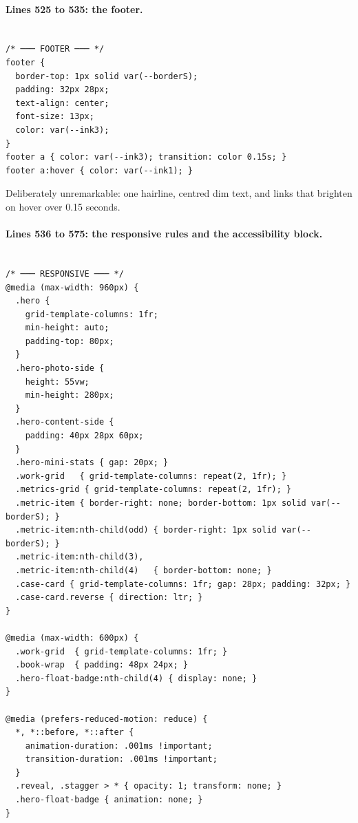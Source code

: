 \paragraph{Lines 525 to 535: the footer.}

\begin{lstlisting}[firstnumber=525,caption={\file{css/site.css}, lines 525--535}]

/* ─── FOOTER ─── */
footer {
  border-top: 1px solid var(--borderS);
  padding: 32px 28px;
  text-align: center;
  font-size: 13px;
  color: var(--ink3);
}
footer a { color: var(--ink3); transition: color 0.15s; }
footer a:hover { color: var(--ink1); }
\end{lstlisting}

Deliberately unremarkable: one hairline, centred dim text, and links that brighten
on hover over 0.15 seconds.

\paragraph{Lines 536 to 575: the responsive rules and the accessibility block.}

\begin{lstlisting}[firstnumber=536,caption={\file{css/site.css}, lines 536--575}]

/* ─── RESPONSIVE ─── */
@media (max-width: 960px) {
  .hero {
    grid-template-columns: 1fr;
    min-height: auto;
    padding-top: 80px;
  }
  .hero-photo-side {
    height: 55vw;
    min-height: 280px;
  }
  .hero-content-side {
    padding: 40px 28px 60px;
  }
  .hero-mini-stats { gap: 20px; }
  .work-grid   { grid-template-columns: repeat(2, 1fr); }
  .metrics-grid { grid-template-columns: repeat(2, 1fr); }
  .metric-item { border-right: none; border-bottom: 1px solid var(--borderS); }
  .metric-item:nth-child(odd) { border-right: 1px solid var(--borderS); }
  .metric-item:nth-child(3),
  .metric-item:nth-child(4)   { border-bottom: none; }
  .case-card { grid-template-columns: 1fr; gap: 28px; padding: 32px; }
  .case-card.reverse { direction: ltr; }
}

@media (max-width: 600px) {
  .work-grid  { grid-template-columns: 1fr; }
  .book-wrap  { padding: 48px 24px; }
  .hero-float-badge:nth-child(4) { display: none; }
}

@media (prefers-reduced-motion: reduce) {
  *, *::before, *::after {
    animation-duration: .001ms !important;
    transition-duration: .001ms !important;
  }
  .reveal, .stagger > * { opacity: 1; transform: none; }
  .hero-float-badge { animation: none; }
}
\end{lstlisting}

